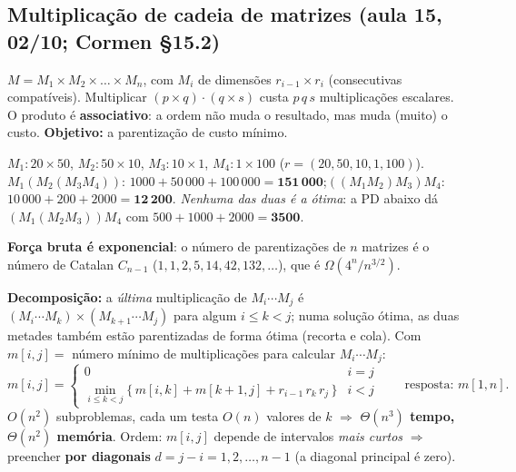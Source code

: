 \subsection{Multiplicação de cadeia de matrizes (aula 15, 02/10; Cormen §15.2)}\label{sec:cadeia}
$M=M_1\times M_2\times\dots\times M_n$, com $M_i$ de dimensões $r_{i-1}\times r_i$ (consecutivas compatíveis). Multiplicar $(p\times q)\cdot(q\times s)$ custa $p\,q\,s$ multiplicações escalares. O produto é \textbf{associativo}: a ordem não muda o resultado, mas muda (muito) o custo. \textbf{Objetivo:} a parentização de custo mínimo.

\begin{exemplo}\label{ex:cadeia}
$M_1:20\times50$, $M_2:50\times10$, $M_3:10\times1$, $M_4:1\times100$ ($r=(20,50,10,1,100)$).
$M_1(M_2(M_3M_4))$: $1000+50\,000+100\,000=\mathbf{151\,000}$;\quad $((M_1M_2)M_3)M_4$: $10\,000+200+2000=\mathbf{12\,200}$.
\emph{Nenhuma das duas é a ótima}: a PD abaixo dá $(M_1(M_2M_3))M_4$ com $500+1000+2000=\mathbf{3500}$.
\end{exemplo}
\textbf{Força bruta é exponencial}: o número de parentizações de $n$ matrizes é o número de Catalan $C_{n-1}$ ($1,1,2,5,14,42,132,\dots$), que é $\Omega(4^n/n^{3/2})$.

\textbf{Decomposição:} a \emph{última} multiplicação de $M_i\cdots M_j$ é $(M_i\cdots M_k)\times(M_{k+1}\cdots M_j)$ para algum $i\le k<j$; numa solução ótima, as duas metades também estão parentizadas de forma ótima (recorta e cola). Com $m[i,j]=$ número mínimo de multiplicações para calcular $M_i\cdots M_j$:
\[
m[i,j]=\begin{cases}0 & i=j\\[2pt] \min\limits_{i\le k<j}\big\{\,m[i,k]+m[k+1,j]+r_{i-1}\,r_k\,r_j\,\big\} & i<j\end{cases}\qquad\text{resposta: } m[1,n].
\]
$O(n^2)$ subproblemas, cada um testa $O(n)$ valores de $k$ $\Rightarrow$ \textbf{$\Theta(n^3)$ tempo, $\Theta(n^2)$ memória}. Ordem: $m[i,j]$ depende de intervalos \emph{mais curtos} $\Rightarrow$ preencher \textbf{por diagonais} $d=j-i=1,2,\dots,n-1$ (a diagonal principal é zero).

